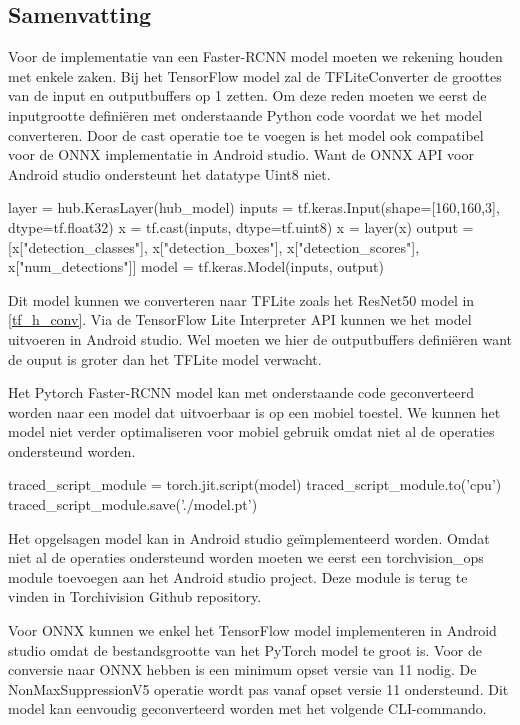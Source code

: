 \subsection{Samenvatting}
Voor de implementatie van een Faster-RCNN model moeten we rekening houden met enkele zaken.
Bij het TensorFlow model zal de TFLiteConverter de groottes van de input en outputbuffers op 1 zetten.
Om deze reden moeten we eerst de inputgrootte defini\"eren met onderstaande Python code voordat we het model converteren.
Door de cast operatie toe te voegen is het model ook compatibel voor de ONNX implementatie in Android studio.
Want de ONNX API voor Android studio ondersteunt het datatype Uint8 niet.

\begin{python}
layer = hub.KerasLayer(hub_model) 
inputs = tf.keras.Input(shape=[160,160,3], dtype=tf.float32)
x = tf.cast(inputs, dtype=tf.uint8)
x = layer(x) 
output = [x["detection_classes"], x["detection_boxes"], x["detection_scores"], x["num_detections"]]
model = tf.keras.Model(inputs, output) 
\end{python}

Dit model kunnen we converteren naar TFLite zoals het ResNet50 model in \ref{tf_h_conv}.
Via de TensorFlow Lite Interpreter API kunnen we het model uitvoeren in Android studio.
Wel moeten we hier de outputbuffers defini\"eren want de ouput is groter dan het TFLite model verwacht.

Het Pytorch Faster-RCNN model kan met onderstaande code geconverteerd worden naar een model dat uitvoerbaar is op een mobiel toestel.
We kunnen het model niet verder optimaliseren voor mobiel gebruik omdat niet al de operaties ondersteund worden.

\begin{python}
traced_script_module = torch.jit.script(model)
traced_script_module.to('cpu') 
traced_script_module.save('./model.pt') 
\end{python}

Het opgelsagen model kan in Android studio ge\"implementeerd worden.
Omdat niet al de operaties ondersteund worden moeten we eerst een torchvision\_ops module toevoegen aan het Android studio project.
Deze module is terug te vinden in Torchivision Github repository.

Voor ONNX kunnen we enkel het TensorFlow model implementeren in Android studio omdat de bestandsgrootte van het PyTorch model te groot is.
Voor de conversie naar ONNX hebben is een minimum opset versie van 11 nodig.
De NonMaxSuppressionV5 operatie wordt pas vanaf opset versie 11 ondersteund.
Dit model kan eenvoudig geconverteerd worden met het volgende CLI-commando.

